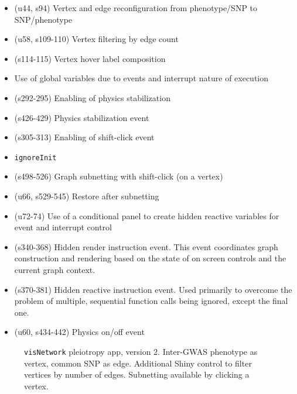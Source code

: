 \documentclass[10pt, letterpaper]{article}
\begin{document}
\begin{spacing}{1.0}
\begin{itemize}
  \item (u44, s94) Vertex and edge reconfiguration from phenotype/SNP to SNP/phenotype
  \item (u58, s109-110) Vertex filtering by edge count
  \item (s114-115) Vertex hover label composition
  \item Use of global variables due to events and interrupt nature of execution
  \item (s292-295) Enabling of physics stabilization
  \item (s426-429) Physics stabilization event
  \item (s305-313) Enabling of shift-click event
  \item \texttt{ignoreInit}
  \item (s498-526) Graph subnetting with shift-click (on a vertex)
  \item (u66, s529-545) Restore after subnetting
  \item (u72-74) Use of a conditional panel to create hidden reactive variables for event and interrupt control
  \item (s340-368) Hidden render instruction event.  This event coordinates graph construction and rendering based on the state of on screen controls and the current graph context.
  \item (s370-381) Hidden reactive instruction event.  Used primarily to overcome the problem of multiple, sequential function calls being ignored, except the final one.
  \item (u60, s434-442) Physics on/off event
\end{itemize}

\begin{figure}[H]
    \centering
    \caption{\texttt{visNetwork} pleiotropy app, version 2.  Inter-GWAS phenotype as vertex, common SNP as edge.  Additional Shiny control to filter vertices by number of edges.  Subnetting available by clicking a vertex.}
    \label{fg:visNetworkAppV2a}
\end{figure}


\end{spacing}
\end{document}
